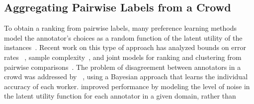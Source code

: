 \subsection{Aggregating Pairwise Labels from a Crowd} %


To obtain a ranking from pairwise labels, many preference learning methods model
the annotator's choices as a random function of the latent utility of the instances~\citep{thurstone1927law}.
Recent work on this type of approach has analyzed bounds on error rates ~\citep{chen2015spectral}, 
sample complexity~\citep{shah2015estimation}, and joint models for ranking and clustering from pairwise comparisons~\citep{li2018simultaneous}.
The problem of disagreement between annotators in a crowd was addressed by ~\citet{chen2013pairwise},
using a Bayesian approach that learns the individual accuracy of each worker.
\citet{wang2016blind} improved performance 
by modeling the level of noise in the latent utility function for each annotator in a given domain, rather than

